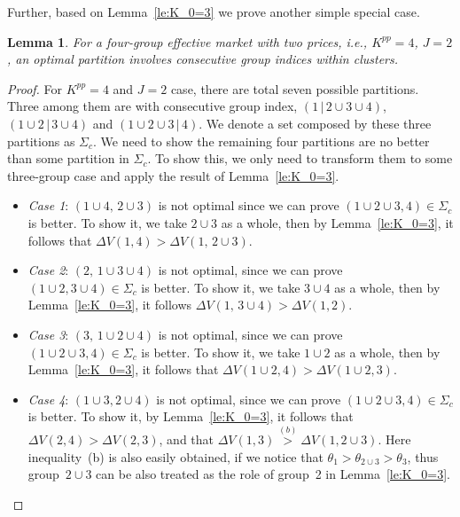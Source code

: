 \documentclass[twocolumn,10pt,twosided]{IEEEtran}
\newtheorem{lemma}{Lemma}
\begin{document}
Further, based on Lemma~\ref{le:K_0=3} we prove another simple special case.
\begin{lemma}
\label{le:K=4}
For a four-group effective market with two prices, i.e., $K^{pp}=4$, $J=2$, an optimal partition involves consecutive group indices within clusters.
\end{lemma}
\begin{proof}
For $K^{pp}=4$ and $J=2$ case, there are total seven possible partitions.
Three among them are with consecutive group index, $(1\,|\,2\cup
3\cup 4)$, $(1\cup 2\,|\,3\cup 4)$ and $(1\cup 2\cup 3\,|\,4)$. We
denote a set composed by these three partitions as $\Sigma_c$. We need to show the remaining four partitions are no better than some partition in $\Sigma_c$. To show this, we only need to transform them to some three-group case and apply the result of Lemma~\ref{le:K_0=3}.
\begin{itemize}
    \item \textit{Case 1}: $(1\cup 4,\,2\cup 3)$ is not optimal since we can prove $(1\cup 2\cup 3,4)\in \Sigma_c$ is better. To show it, we take $2\cup 3$ as a whole, then by Lemma~\ref{le:K_0=3}, it follows that $\Delta V(1,4)>\Delta V(1,\,2\cup 3)$.

     \item \emph{Case 2}: $(2,\, 1\cup 3\cup 4)$ is not optimal, since we can prove $(1\cup 2, 3\cup 4)\in\Sigma_c$ is better. To show it, we take $3\cup 4$ as a whole, then by Lemma~\ref{le:K_0=3}, it follows $\Delta V(1,\,3\cup 4)>\Delta V(1, 2).$

     \item \emph{Case 3}: $(3,\, 1\cup 2\cup 4)$ is not optimal, since we can prove $(1\cup 2\cup 3, 4)\in\Sigma_c$ is better. To show it, we take $1\cup 2$ as a whole, then by Lemma~\ref{le:K_0=3}, it follows that $\Delta V(1\cup 2,4)>\Delta V(1\cup 2,3).$

     \item \emph{Case 4}: $( 1\cup 3, 2\cup 4)$ is not optimal, since we can prove $(1\cup 2\cup 3, 4)\in\Sigma_c$ is better. To show it, by Lemma~\ref{le:K_0=3}, it follows that $\Delta V(2,4)>\Delta V(2,3)$, and that $\Delta V(1,3)\overset{(b)}{>}\Delta V(1,2\cup 3)$. Here inequality~(b) is also easily obtained, if we notice that $\theta_1>\theta_{2\cup 3}>\theta_3$, thus group~$2\cup 3$ can be also treated as the role of group~2 in Lemma~\ref{le:K_0=3}.
\end{itemize}
\end{proof}
\end{document}
